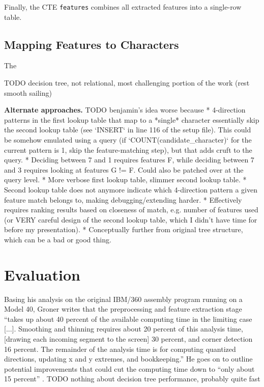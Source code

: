 \documentclass[sigconf]{acmart}
\begin{document}
Finally, the CTE \texttt{features} combines all extracted features into a single-row table.

\subsection{Mapping Features to Characters}

The 

TODO decision tree, not relational, most challenging portion of the work (rest smooth sailing)

\textbf{Alternate approaches.} TODO benjamin's idea worse because
* 4-direction patterns in the first lookup table that map to a *single* character essentially skip the second lookup table (see `INSERT` in line 116 of the setup file). This could be somehow emulated using a query (if `COUNT(candidate\_character)` for the current pattern is 1, skip the feature-matching step), but that adds cruft to the query.
* Deciding between 7 and 1 requires features F, while deciding between 7 and 3 requires looking at features G != F. Could also be patched over at the query level.
* More verbose first lookup table, slimmer second lookup table.
* Second lookup table does not anymore indicate which 4-direction pattern a given feature match belongs to, making debugging/extending harder.
* Effectively requires ranking results based on closeness of match, e.g. number of features used (or VERY careful design of the second lookup table, which I didn't have time for before my presentation).
* Conceptually further from original tree structure, which can be a bad or good thing.

\section{Evaluation}

Basing his analysis on the original IBM/360 assembly program running on a Model 40, Groner writes that the preprocessing and feature extraction stage \enquote{takes up about 40 percent of the available computing time in the limiting case [...]. Smoothing and thinning requires about 20 percent of this analysis time, [drawing each incoming segment to the screen] 30 percent, and corner detection 16 percent. The remainder of the analysis time is for computing quantized directions, updating x and y extremes, and bookkeeping.} He goes on to outline potential improvements that could cut the computing time down to \enquote{only about 15 percent} \cite{groner}. TODO nothing about decision tree performance, probably quite fast
\end{document}
